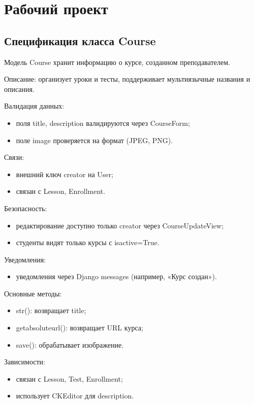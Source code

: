 \section{Рабочий проект}

\subsection{Спецификация класса Course}

Модель Course хранит информацию о курсе, созданном преподавателем.

Описание: организует уроки и тесты, поддерживает мультиязычные названия и описания.

Валидация данных:
	\begin{itemize}
		\item поля title, description валидируются через CourseForm;
		\item поле image проверяется на формат (JPEG, PNG).
	\end{itemize}
	
Связи:
	\begin{itemize}
		\item внешний ключ creator на User;
		\item связан с Lesson, Enrollment.
	\end{itemize}
		
Безопасность:
	\begin{itemize}
		\item редактирование доступно только creator через CourseUpdateView;
		\item студенты видят только курсы с isactive=True.
	\end{itemize}
	
Уведомления:
	\begin{itemize}
		\item уведомления через Django messages (например, «Курс создан»).
	\end{itemize}
	
Основные методы:
	\begin{itemize}
		\item str(): возвращает title;
		\item getabsoluteurl(): возвращает URL курса;
		\item save(): обрабатывает изображение.
	\end{itemize}
	
Зависимости:
	\begin{itemize}
		\item связан с Lesson, Test, Enrollment;
		\item использует CKEditor для description.
	\end{itemize}

